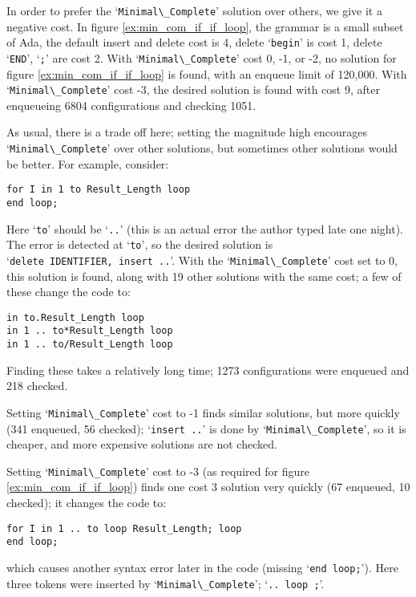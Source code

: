 \documentclass{article}
\newcommand{\code}[1]{`\lstinline|#1|'}
\begin{document}
In order to prefer the \code{Minimal\_Complete} solution over others,
we give it a negative cost. In figure \ref{ex:min_com_if_if_loop}, the
grammar is a small subset of Ada, the
default insert and delete cost is 4, delete \code{begin} is cost 1,
delete \code{END}, \code{;} are cost 2. With \code{Minimal\_Complete}
cost 0, -1, or -2, no solution for figure \ref{ex:min_com_if_if_loop}
is found, with an enqueue limit of 120,000. With
\code{Minimal\_Complete} cost -3, the desired solution is found with
cost 9, after enqueueing 6804 configurations and checking 1051.

As usual, there is a trade off here; setting the magnitude high
encourages \code{Minimal\_Complete} over other solutions, but sometimes
other solutions would be better. For example, consider:
\begin{lstlisting}
for I in 1 to Result_Length loop
end loop;
\end{lstlisting}
Here \code{to} should be \code{..} (this is an actual error the author
typed late one night). The error is detected at \code{to}, so the
desired solution is\\ \code{delete IDENTIFIER, insert ..}. With the
\code{Minimal\_Complete} cost set to 0, this solution is found, along
with 19 other solutions with the same cost; a few of these change the
code to:

\begin{lstlisting}
in to.Result_Length loop
in 1 .. to*Result_Length loop
in 1 .. to/Result_Length loop
\end{lstlisting}

Finding these takes a relatively long time; 1273 configurations
were enqueued and 218 checked.

Setting \code{Minimal\_Complete} cost to -1 finds similar solutions,
but more quickly (341 enqueued, 56 checked); \code{insert ..} is done
by \code{Minimal\_Complete}, so it is cheaper, and more expensive
solutions are not checked.

Setting \code{Minimal\_Complete} cost to -3 (as required for
figure \ref{ex:min_com_if_if_loop}) finds one cost 3 solution very
quickly (67 enqueued, 10 checked); it changes the code to:
\begin{lstlisting}
for I in 1 .. to loop Result_Length; loop
end loop;
\end{lstlisting}
which causes another syntax error later in the code (missing
\code{end loop;}). Here three tokens were inserted by
\code{Minimal\_Complete}; \code{.. loop ;}.
\end{document}
